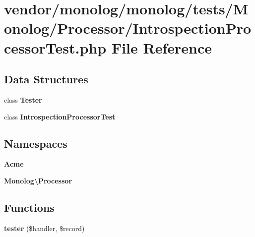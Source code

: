 \section{vendor/monolog/monolog/tests/\+Monolog/\+Processor/\+Introspection\+Processor\+Test.php File Reference}
\label{_introspection_processor_test_8php}
\subsection*{Data Structures}
\begin{DoxyCompactItemize}
\item 
class {\bf Tester}
\item 
class {\bf Introspection\+Processor\+Test}
\end{DoxyCompactItemize}
\subsection*{Namespaces}
\begin{DoxyCompactItemize}
\item 
 {\bf Acme}
\item 
 {\bf Monolog\textbackslash{}\+Processor}
\end{DoxyCompactItemize}
\subsection*{Functions}
\begin{DoxyCompactItemize}
\item 
{\bf tester} (\$handler, \$record)
\end{DoxyCompactItemize}
